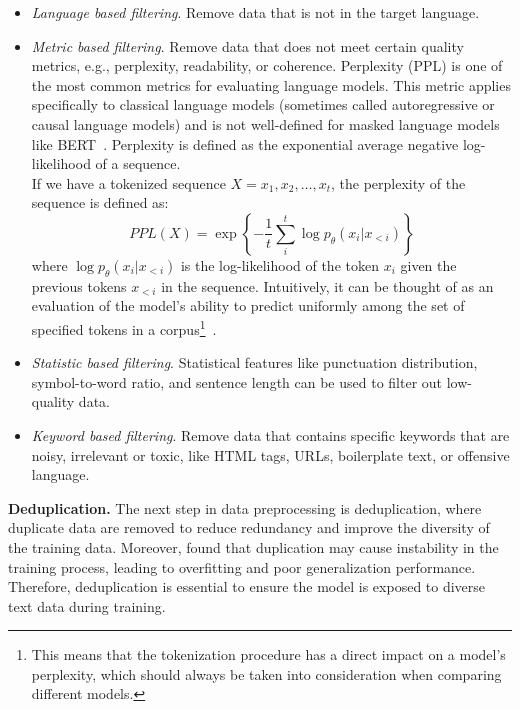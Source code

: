 \begin{itemize}
	\item \textit{Language based filtering}. {Remove data that is not in the target language.}
	\item \textit{Metric based filtering}. {Remove data that does not meet certain quality metrics, e.g., perplexity, readability, or coherence.
	      Perplexity (PPL) is one of the most common metrics for evaluating language models.
	      This metric applies specifically to classical language models (sometimes called autoregressive or causal language models) and is not well-defined for masked language models like BERT~\cite{devlin2019bert}.
	      Perplexity is defined as the exponential average negative log-likelihood of a sequence.\\
	      If we have a tokenized sequence \(X = x_1, x_2, \ldots, x_t\), the perplexity of the sequence is defined as:
	      \begin{equation}
		      PPL(X) = \exp \left\{ -\frac{1}{t} \sum_{i}^{t} \log p_{\theta}(x_i | x_{<i}) \right\}
		      \label{eq:equation_perplexity}
	      \end{equation}
	      where \(\log p_{\theta}(x_i | x_{<i})\) is the log-likelihood of the token \(x_i\) given the previous tokens \(x_{<i}\) in the sequence.
	      Intuitively, it can be thought of as an evaluation of the model's ability to predict uniformly among the set of specified tokens in a corpus\footnote{This means that the tokenization procedure has a direct impact on a model’s perplexity, which should always be taken into consideration when comparing different models.}~\cite{huggingface2023perplexity}.
	      }
	\item \textit{Statistic based filtering}. {Statistical features like punctuation distribution, symbol-to-word ratio, and sentence length can be used to filter out low-quality data.
	      }
	\item \textit{Keyword based filtering}. {Remove data that contains specific keywords that are noisy, irrelevant or toxic, like HTML tags, URLs, boilerplate text, or offensive language.}
\end{itemize}

\textbf{Deduplication.}
The next step in data preprocessing is deduplication, where duplicate data are removed to reduce redundancy and improve the diversity of the training data.
Moreover, \textcite{hernandez2022scaling} found that duplication may cause instability in the training process, leading to overfitting and poor generalization performance.
Therefore, deduplication is essential to ensure the model is exposed to diverse text data during training.

